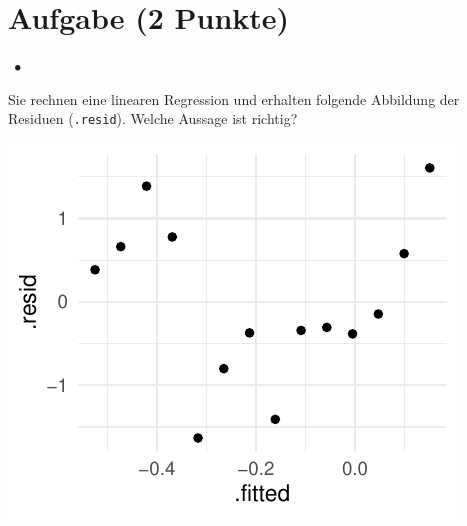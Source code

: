 \documentclass[a4paper, 9pt]{scrartcl}\usepackage[]{graphicx}\usepackage[]{xcolor}
\makeatletter
\def\maxwidth{ %
  \ifdim\Gin@nat@width>\linewidth
    \linewidth
  \else
    \Gin@nat@width
  \fi
}
\makeatother
\begin{document}
\section{Aufgabe \hfill (2 Punkte)}

\ifcollection
\begin{flushright}
\tiny\vspace{-2Ex}
\textbf{\examinhaltstart}
\exammodulestatversuch $\;\bullet$
\exammodulebiostat
\vspace{-1Ex}
\end{flushright}
\fi




Sie rechnen eine linearen Regression und erhalten folgende Abbildung der Residuen (\texttt{.resid}). Welche Aussage ist richtig?



{\centering \includegraphics[width=\maxwidth]{img/mc-regression-06-a-1} 

}
\end{document}

